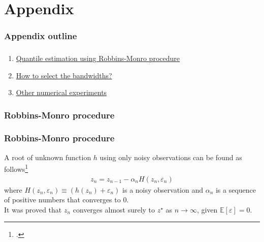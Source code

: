 \documentclass[aspectratio=169]{beamer}
\begin{document}
\section{}
	\begin{frame}
		~\\[-1em]
		\printbibliography
	\end{frame}
\section{}
	
\section{Appendix}	
		\subsubsection{Appendix outline}
			\begin{frame}
				\frametitle{\insertsubsubsection}
				
				\begin{enumerate}
					\item \hyperlink{robMonro}{\color{blue} Quantile estimation using Robbins-Monro procedure}
					\item \hyperlink{bandwidth}{\color{blue} How to select the bandwidths?}
					\item \hyperlink{numResults}{\color{blue} Other numerical experiments}
				\end{enumerate}
				
			\end{frame}
	
		\subsubsection{Robbins-Monro procedure}\label{robMonro}
			\begin{frame}
				\frametitle{Robbins-Monro procedure}
				
				 A root of unknown function $ h $ using only noisy observations can be found as follows\footcite{Robbins1951}
				\begin{align}
				z_n = z_{n-1} - \alpha_n H(z_n, \varepsilon_n)
				\end{align}
				where $ H(z_n, \varepsilon_n) \equiv (h(z_n) + \varepsilon_n) $ is a noisy observation and $ \alpha_n $ is a sequence of positive numbers that converges to 0. \\[1em]
				
				\onslide<2-> It was proved that $ z_n $ converges almost surely to $ z^\star $ as $ n\rightarrow \infty $, given $ \mathbb{E}[\varepsilon]=0 $.
				
			\end{frame}
			
\end{document}
